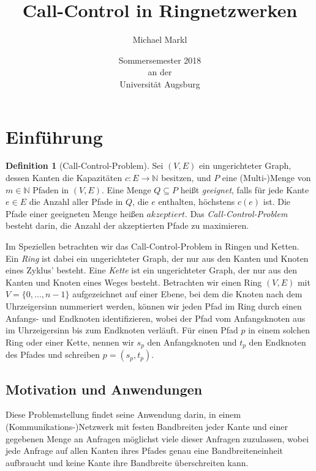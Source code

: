 \documentclass[11pt]{article}
\title{\bfseries Call-Control in Ringnetzwerken}
\author{Michael Markl}
\date{Sommersemester 2018\\ an der\\ Universität Augsburg}
\theoremstyle{definition}
\newtheorem{definition}{Definition}[section]
\theoremstyle{theorem}
\begin{document}
    \maketitle
    \clearpage

    \tableofcontents

    \clearpage

    \setcounter{section}{0}

    \section{Einführung}\label{sec:einführung}

    \begin{definition}[Call-Control-Problem]
        Sei $(V,E)$ ein ungerichteter Graph, dessen Kanten die Kapazitäten $c: E \to \mathbb{N}$ besitzen, und $P$ eine
        (Multi-)Menge von $m \in \mathbb{N}$ Pfaden in $(V,E)$.
        Eine Menge $Q \subseteq P$ heißt {\em geeignet}, falls für jede Kante $e \in E$ die Anzahl aller Pfade in $Q$,
        die $e$ enthalten, höchstens $c(e)$ ist.
        Die Pfade einer geeigneten Menge heißen $akzeptiert$.
        Das {\em Call-Control-Problem} besteht darin, die Anzahl der akzeptierten Pfade zu maximieren.
    \end{definition}

    Im Speziellen betrachten wir das Call-Control-Problem in Ringen und Ketten.
    Ein {\em Ring} ist dabei ein ungerichteter Graph, der nur aus den Kanten und Knoten eines Zyklus' besteht.
    Eine {\em Kette} ist ein ungerichteter Graph, der nur aus den Kanten und Knoten eines Weges besteht.
    Betrachten wir einen Ring $(V,E)$ mit $V=\{0, \dots , n-1\}$ aufgezeichnet auf einer Ebene, bei dem die Knoten nach
    dem Uhrzeigersinn nummeriert werden, können wir jeden Pfad im Ring durch einen Anfangs- und Endknoten identifizieren,
    wobei der Pfad vom Anfangsknoten aus im Uhrzeigersinn bis zum Endknoten \glqq verläuft\grqq.
    Für einen Pfad $p$ in einem solchen Ring oder einer Kette, nennen wir $s_p$ den
    Anfangsknoten und $t_p$ den Endknoten des Pfades und schreiben $p=(s_p, t_p)$.


    \subsection{Motivation und Anwendungen}\label{subsec:motivationUndAnwendungen}
    Diese Problemstellung findet seine Anwendung darin, in einem (Kommunikations-)Netzwerk mit festen Bandbreiten jeder
    Kante und einer gegebenen Menge an Anfragen möglichst viele dieser Anfragen zuzulassen, wobei jede Anfrage auf allen
    Kanten ihres Pfades genau eine Bandbreiteneinheit aufbraucht und keine Kante ihre Bandbreite überschreiten kann.
\end{document}
